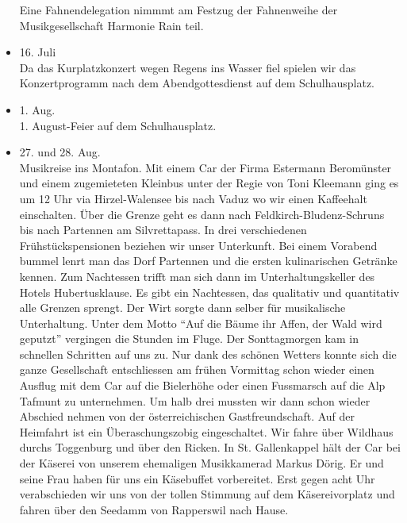 \begin{history}
\begin{itemize}
              Eine Fahnendelegation nimmmt am Festzug der Fahnenweihe der
              Musikgesellschaft Harmonie Rain teil.

        \item 16. Juli\\
              Da das Kurplatzkonzert wegen Regens ins Wasser fiel spielen wir das
              Konzertprogramm nach dem Abendgottesdienst auf dem Schulhausplatz.

        \item 1. Aug.\\
              1. August-Feier auf dem Schulhausplatz.

        \item 27. und 28. Aug.\\
              Musikreise ins Montafon. Mit einem Car der Firma Estermann Beromünster
              und einem zugemieteten Kleinbus unter der Regie von Toni Kleemann ging
              es um 12 Uhr via Hirzel-Walensee bis nach Vaduz wo wir einen Kaffeehalt
              einschalten. Über die Grenze geht es dann nach Feldkirch-Bludenz-Schruns
              bis nach Partennen am Silvrettapass. In drei verschiedenen
              Frühstückspensionen beziehen wir unser Unterkunft. Bei einem Vorabend
              bummel lenrt man das Dorf Partennen und die ersten kulinarischen
              Getränke kennen. Zum Nachtessen trifft man sich dann im
              Unterhaltungskeller des Hotels Hubertusklause. Es gibt ein Nachtessen,
              das qualitativ und quantitativ alle Grenzen sprengt. Der Wirt sorgte
              dann selber für musikalische Unterhaltung. Unter dem Motto \enquote{Auf
                  die Bäume ihr Affen, der Wald wird geputzt} vergingen die Stunden im
              Fluge. Der Sonttagmorgen kam in schnellen Schritten auf uns zu. Nur dank
              des schönen Wetters konnte sich die ganze Gesellschaft entschliessen am
              frühen Vormittag schon wieder einen Ausflug mit dem Car auf die
              Bielerhöhe oder einen Fussmarsch auf die Alp Tafmunt zu unternehmen. Um
              halb drei mussten wir dann schon wieder Abschied nehmen von der
              österreichischen Gastfreundschaft. Auf der Heimfahrt ist ein
              Überaschungszobig eingeschaltet. Wir fahre über Wildhaus durchs
              Toggenburg und über den Ricken. In St. Gallenkappel hält der Car bei der
              Käserei von unserem ehemaligen Musikkamerad Markus Dörig. Er und seine
              Frau haben für uns ein Käsebuffet vorbereitet. Erst gegen acht Uhr
              verabschieden wir uns von der tollen Stimmung auf dem Käsereivorplatz
              und fahren über den Seedamm von Rapperswil nach Hause.


\end{itemize}
\end{history}
